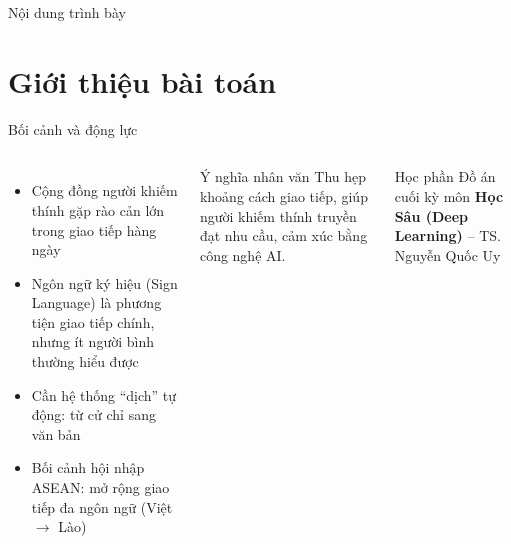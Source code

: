 ﻿\documentclass[aspectratio=169, 11pt]{beamer}
\begin{document}
\begin{frame}{Nội dung trình bày}
    \tableofcontents
\end{frame}

\section{Giới thiệu bài toán}

\begin{frame}{Bối cảnh và động lực}
    \begin{columns}[T]
        \begin{itemize}
            \item Cộng đồng người khiếm thính gặp rào cản lớn trong giao tiếp hàng ngày
            \item Ngôn ngữ ký hiệu (Sign Language) là phương tiện giao tiếp chính, nhưng ít người bình thường hiểu được
            \item Cần hệ thống ``dịch'' tự động: từ cử chỉ sang văn bản
            \item Bối cảnh hội nhập ASEAN: mở rộng giao tiếp đa ngôn ngữ (Việt $\rightarrow$ Lào)
        \end{itemize}

        \begin{alertblock}{Ý nghĩa nhân văn}
            \small Thu hẹp khoảng cách giao tiếp, giúp người khiếm thính truyền đạt nhu cầu, cảm xúc bằng công nghệ AI.
        \end{alertblock}
        \vspace{0.2cm}
        \begin{block}{Học phần}
            \small Đồ án cuối kỳ môn \textbf{Học Sâu (Deep Learning)} -- TS. Nguyễn Quốc Uy
        \end{block}
    \end{columns}
\end{frame}
\end{document}
